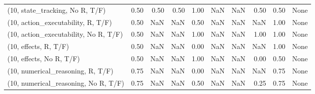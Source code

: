 \begin{table*}[h!]
\begin{adjustbox}{width=2\columnwidth,center}
\begin{tabular}{lrrr|rrr|rrr}
(10, state\_tracking, No R, T/F)       &                      0.50 &                  0.50 &                      0.50 &                          1.00 &                       NaN &                           NaN &                                   0.50 &                               0.50 &                                  None \\
(10, action\_executability, R, T/F)    &                      0.50 &                   NaN &                       NaN &                          0.50 &                       NaN &                           NaN &                                    NaN &                               1.00 &                                  None \\
(10, action\_executability, No R, T/F) &                      0.50 &                   NaN &                       NaN &                          1.00 &                       NaN &                           NaN &                                   1.00 &                               1.00 &                                  None \\
(10, effects, R, T/F)                 &                      0.50 &                   NaN &                       NaN &                          0.00 &                       NaN &                           NaN &                                    NaN &                               1.00 &                                  None \\
(10, effects, No R, T/F)              &                      0.50 &                   NaN &                       NaN &                          1.00 &                       NaN &                           NaN &                                   0.00 &                               0.50 &                                  None \\
(10, numerical\_reasoning, R, T/F)     &                      0.75 &                   NaN &                       NaN &                          0.00 &                       NaN &                           NaN &                                    NaN &                               0.75 &                                  None \\
(10, numerical\_reasoning, No R, T/F)  &                      0.75 &                   NaN &                       NaN &                          0.50 &                       NaN &                           NaN &                                   0.25 &                               0.75 &                                  None \\

\end{tabular}
\end{adjustbox}
\end{table*}
